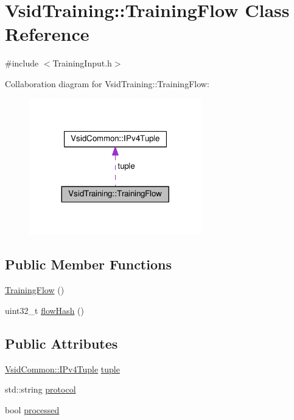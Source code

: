 \hypertarget{class_vsid_training_1_1_training_flow}{\section{Vsid\-Training\-:\-:Training\-Flow Class Reference}
\label{class_vsid_training_1_1_training_flow}
}


{\ttfamily \#include $<$Training\-Input.\-h$>$}



Collaboration diagram for Vsid\-Training\-:\-:Training\-Flow\-:
\nopagebreak
\begin{figure}[H]
\begin{center}
\leavevmode
\includegraphics[width=212pt]{class_vsid_training_1_1_training_flow__coll__graph}
\end{center}
\end{figure}
\subsection*{Public Member Functions}
\begin{DoxyCompactItemize}
\item 
\hyperlink{class_vsid_training_1_1_training_flow_ab58a8190ba36342eb52eb349d0168550}{Training\-Flow} ()
\item 
uint32\-\_\-t \hyperlink{class_vsid_training_1_1_training_flow_af4be7c7b6a89c6488552f27f8ae98135}{flow\-Hash} ()
\end{DoxyCompactItemize}
\subsection*{Public Attributes}
\begin{DoxyCompactItemize}
\item 
\hyperlink{class_vsid_common_1_1_i_pv4_tuple}{Vsid\-Common\-::\-I\-Pv4\-Tuple} \hyperlink{class_vsid_training_1_1_training_flow_a687b85a2f6d23cb0ea63f61637df5bcf}{tuple}
\item 
std\-::string \hyperlink{class_vsid_training_1_1_training_flow_ac4d53b04d9cbf07636611ad9c6be3b95}{protocol}
\item 
bool \hyperlink{class_vsid_training_1_1_training_flow_aa9ac4d96ccf3f95e54b7baae9bed6f29}{processed}
\end{DoxyCompactItemize}


